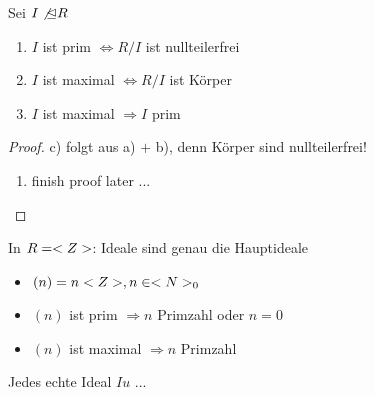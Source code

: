 \begin{proposition}
	Sei $I \not\unlhd R$ %
	\begin{enumerate}
		\item $I$ ist prim $\Leftrightarrow R/I$ ist nullteilerfrei
		\item $I$ ist maximal $\Leftrightarrow R/I$ ist Körper
		\item $I$ ist maximal $\Rightarrow I$ prim
	\end{enumerate}
\end{proposition}

\begin{proof}
	c) folgt aus a) $+$ b), denn Körper sind nullteilerfrei!
	\begin{enumerate}
		\item 
	finish proof later ...
	\end{enumerate}
\end{proof}

\begin{example}
	In $R = <Z>$: Ideale sind genau die Hauptideale
	\begin{itemize}
		\item $(n) = n<Z>, n \in <N>_0$
		\item $(n)$ ist prim $\Rightarrow n$ Primzahl oder $n = 0$
		\item $(n)$ ist maximal $\Rightarrow n$ Primzahl
	\end{itemize}
\end{example}

\begin{proposition}
	Jedes echte Ideal $I u$ ...
\end{proposition}